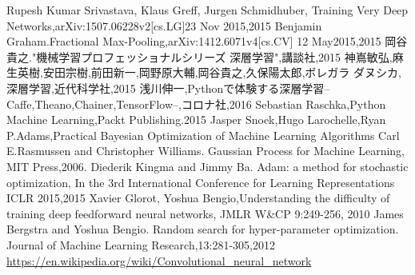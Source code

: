 \begin{thebibliography}{99}
  Rupesh Kumar Srivastava, Klaus Greff, Jurgen Schmidhuber, Training Very Deep Networks,arXiv:1507.06228v2[cs.LG]23 Nov 2015,2015
  Benjamin Graham.Fractional Max-Pooling,arXiv:1412.6071v4[cs.CV] 12 May2015,2015
  岡谷貴之."機械学習プロフェッショナルシリーズ 深層学習",講談社,2015
  神嶌敏弘,麻生英樹,安田宗樹,前田新一,岡野原大輔,岡谷貴之,久保陽太郎,ボレガラ ダヌシカ,深層学習,近代科学社,2015
  浅川伸一,Pythonで体験する深層学習--Caffe,Theano,Chainer,TensorFlow--,コロナ社,2016
    Sebastian Raschka,Python Machine Learning,Packt Publishing.2015
  Jasper Snoek,Hugo Larochelle,Ryan P.Adams,Practical Bayesian Optimization of Machine Learning Algorithms
  Carl E.Rasmussen and Christopher Williams. Gaussian Process for Machine Learning, MIT Press,2006.
  Diederik Kingma and Jimmy Ba. Adam: a method for stochastic optimization, In the 3rd International Conference for Learning Representations ICLR 2015,2015
  Xavier Glorot, Yoshua Bengio,Understanding the difficulty of training deep feedforward neural networks, JMLR W\&CP 9:249-256, 2010
   James Bergstra and Yoshua Bengio. Random search for hyper-parameter optimization. Journal of Machine Learning Research,13:281-305,2012
   \url{https://en.wikipedia.org/wiki/Convolutional_neural_network}
\end{thebibliography}





